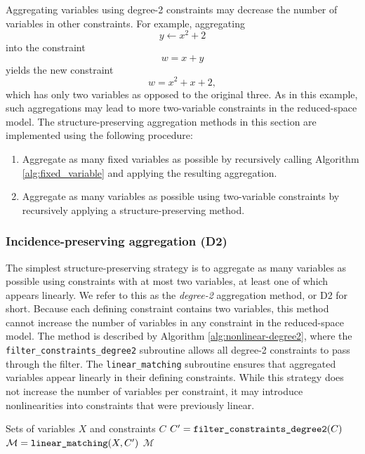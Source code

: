 \documentclass[smallextended]{svjour3}
\newcommand{\rev}[1]{{#1}}
\begin{document}
Aggregating variables using degree-2 constraints may decrease the number of variables
in other constraints. For example, aggregating
\[ y \leftarrow x^2 + 2 \]
into the constraint
\[ w = x + y \]
yields the new constraint
\[ w = x^2 + x + 2, \]
which has only two variables as opposed to the original three.
As in this example, such aggregations may lead to more two-variable constraints
in the reduced-space model.
The structure-preserving aggregation methods in this section are implemented
using the following procedure:
\begin{enumerate}
  \item Aggregate as many fixed variables as possible by recursively calling
    Algorithm \ref{alg:fixed_variable} and applying the resulting aggregation.
  \item Aggregate as many variables as possible using two-variable constraints
    by recursively applying a structure-preserving method.
\end{enumerate}

\subsubsection{Incidence-preserving aggregation \rev{(D2)}}\label{sec:no-fill agg}
The simplest structure-preserving strategy is to aggregate as many variables as possible
using constraints with at most two variables, at least one of which appears linearly.
We refer to this as the {\it degree-2} aggregation method, or D2 for short.
Because each defining constraint contains two variables, this method cannot increase
the number of variables in any constraint in the reduced-space model.
The method is described by Algorithm \ref{alg:nonlinear-degree2},
where the {\tt filter\_constraints\_degree2} subroutine
allows all degree-2 constraints to pass through the filter. The {\tt linear\_matching}
subroutine ensures that aggregated variables appear linearly in their defining constraints.
While this strategy does not increase the number of variables per constraint, it may
introduce nonlinearities into constraints that were previously linear.

\begin{algorithm}
  \caption{: {\tt degree\_two\_aggregation\_set}}
  \begin{algorithmic}[1]
     Sets of variables $X$ and constraints $C$
    \State $C' = \text{\tt filter\_constraints\_degree2}(C)$
    \State $\mathcal{M} = \text{\tt linear\_matching}(X, C')$
     $\mathcal{M}$
  \end{algorithmic}
  \label{alg:nonlinear-degree2}
\end{algorithm}
\end{document}
